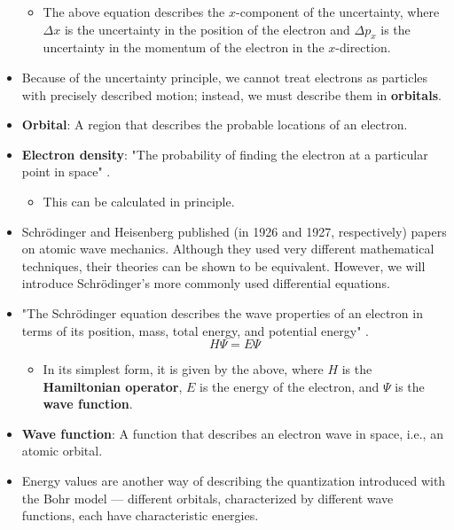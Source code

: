 \documentclass[../main.tex]{subfiles}
\begin{document}
\begin{itemize}
    \begin{itemize}
        \item The above equation describes the $x$-component of the uncertainty, where $\Delta x$ is the uncertainty in the position of the electron and $\Delta p_x$ is the uncertainty in the momentum of the electron in the $x$-direction.
    \end{itemize}
    \item Because of the uncertainty principle, we cannot treat electrons as particles with precisely described motion; instead, we must describe them in \textbf{orbitals}.
    \item \textbf{Orbital}: A region that describes the probable locations of an electron.
    \item \textbf{Electron density}: "The probability of finding the electron at a particular point in space" \parencite[14]{bib:MiesslerFischerTarr}.
    \begin{itemize}
        \item This can be calculated in principle.
    \end{itemize}
    \item Schr\"{o}dinger and Heisenberg published (in 1926 and 1927, respectively) papers on atomic wave mechanics. Although they used very different mathematical techniques, their theories can be shown to be equivalent. However, we will introduce Schr\"{o}dinger's more commonly used differential equations.
    \item "The Schr\"{o}dinger equation describes the wave properties of an electron in terms of its position, mass, total energy, and potential energy" \parencite[14]{bib:MiesslerFischerTarr}.
    \begin{equation*}
        H\Psi = E\Psi
    \end{equation*}
    \begin{itemize}
        \item In its simplest form, it is given by the above, where $H$ is the \textbf{Hamiltonian operator}, $E$ is the energy of the electron, and $\Psi$ is the \textbf{wave function}.
    \end{itemize}
    \item \textbf{Wave function}: A function that describes an electron wave in space, i.e., an atomic orbital.
    \item Energy values are another way of describing the quantization introduced with the Bohr model --- different orbitals, characterized by different wave functions, each have characteristic energies.

\end{itemize}
\end{document}
